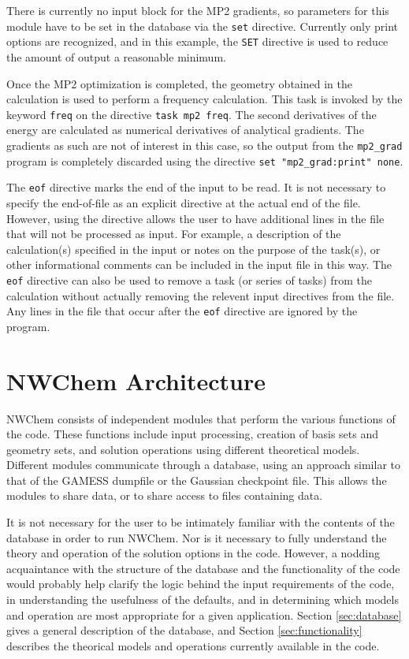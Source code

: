 There is currently no input block for the MP2 gradients, so parameters
for this module have to be set in the database via the {\tt set}
directive. Currently only print options are recognized, and in this
example, the \verb+SET+ directive is used to
reduce the amount of output a reasonable minimum.

Once the MP2 optimization is completed, the geometry obtained in the
calculation is used to perform a frequency calculation.  This task is
invoked by the keyword \verb+freq+ on the directive \verb+task mp2 freq+.
The second
derivatives of the energy are calculated as numerical derivatives of
analytical gradients. The gradients as such are not of interest
in this case, so 
the output from the {\tt mp2\_grad} program is completely discarded
using the directive \verb+set "mp2_grad:print" none+.

The {\tt eof} directive marks the end of the input to be read. It is not
necessary to specify the end-of-file as an explicit directive at the
actual end of the file.  However, using the directive allows the user to
have additional lines in the file that will not be processed as input.  For
example, a description of the calculation(s) specified in the input or
notes on the purpose of the task(s), or other informational comments can be
included in the input file in this way.  The {\tt eof} directive can also
be used to remove a task (or series of tasks) from the calculation without
actually removing the relevent input directives from the file.  Any lines in the file
that occur after the {\tt eof} directive are ignored by
the program.



\section{NWChem Architecture}
\label{sec:arch}

NWChem consists of independent modules that perform the various functions
of the code.  These functions include input processing, creation of basis
sets and geometry sets, and solution operations using different theoretical
models.  Different modules communicate through a database, using an approach
similar to that of the GAMESS dumpfile or the Gaussian checkpoint file.  
This allows the modules to share data, or to share access to files containing
data.

It is not necessary for the user to be intimately familiar with the contents
of the database in order to run NWChem.  Nor is it necessary to fully
understand the theory and operation of the solution options in the code.
However, a nodding acquaintance with the structure of the database and 
the functionality of the code would probably help clarify the logic behind
the input requirements of the code, in understanding the usefulness of the
defaults, and in determining which models and operation are most appropriate
for a given application.  Section \ref{sec:database} gives a general 
description of the database, and Section \ref{sec:functionality} describes 
the theorical models and operations currently available in the code.

